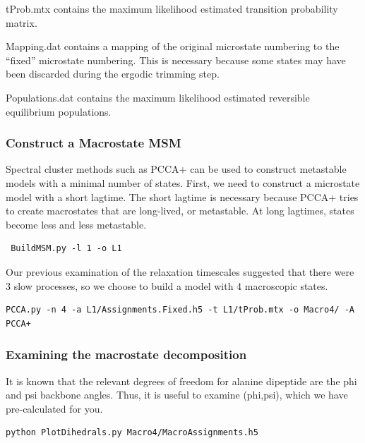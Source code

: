 \documentclass[12pt]{article}
\begin{document}
tProb.mtx contains the maximum likelihood estimated transition probability matrix.  

Mapping.dat contains a mapping of the original microstate numbering to the “fixed” microstate numbering.  This is necessary because some states may have been discarded during the ergodic trimming step.  

Populations.dat contains the maximum likelihood estimated reversible equilibrium populations.  

\subsubsection{Construct a Macrostate MSM}

Spectral cluster methods such as PCCA+  \cite{Deuflhard2000, Deuflhard2005, kube2007coarse} can be used to construct metastable models with a minimal number of states.  First, we need to construct a microstate model with a short lagtime.  The short lagtime is necessary because PCCA+ tries to create macrostates that are long-lived, or metastable.  At long lagtimes, states become less and less metastable.

\begin{verbatim}
 BuildMSM.py -l 1 -o L1
\end{verbatim}

Our previous examination of the relaxation timescales suggested that there were 3 slow processes, so we choose to build a model with 4 macroscopic states.  

\begin{verbatim}
PCCA.py -n 4 -a L1/Assignments.Fixed.h5 -t L1/tProb.mtx -o Macro4/ -A PCCA+
\end{verbatim}

\subsubsection{Examining the macrostate decomposition}

It is known that the relevant degrees of freedom for alanine dipeptide are the phi and psi backbone angles.  Thus, it is useful to examine (phi,psi), which we have pre-calculated for you.

\begin{verbatim}
python PlotDihedrals.py Macro4/MacroAssignments.h5
\end{verbatim}
\end{document}
